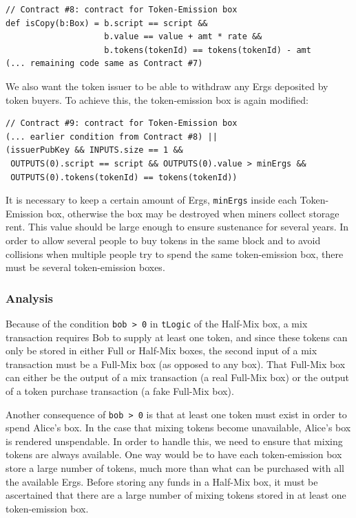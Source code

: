 \documentclass[runningheads]{llncs}
\begin{document}
{\small
\begin{Verbatim}[frame=single]
// Contract #8: contract for Token-Emission box
def isCopy(b:Box) = b.script == script && 
                    b.value == value + amt * rate &&
                    b.tokens(tokenId) == tokens(tokenId) - amt
(... remaining code same as Contract #7)
\end{Verbatim}
}

We also want the token issuer to be able to withdraw any Ergs deposited by token buyers. To achieve this, the token-emission box is again modified:

{\small
\begin{Verbatim}[frame=single]
// Contract #9: contract for Token-Emission box
(... earlier condition from Contract #8) || 
(issuerPubKey && INPUTS.size == 1 && 
 OUTPUTS(0).script == script && OUTPUTS(0).value > minErgs &&
 OUTPUTS(0).tokens(tokenId) == tokens(tokenId))
\end{Verbatim}
}
It is necessary to keep a certain amount of Ergs, \texttt{minErgs} inside each Token-Emission box, otherwise the box may be destroyed when miners collect storage rent. This value should be large enough to ensure sustenance for several years. 
In order to allow several people to buy tokens in the same block and to avoid collisions when multiple people try to spend the same token-emission box, there must be several token-emission boxes. 

\subsubsection{Analysis}

Because of the condition \texttt{bob > 0} in \texttt{tLogic} of the Half-Mix box, a mix transaction requires Bob to supply at least one token, and since these tokens can only be stored in either Full or Half-Mix boxes, the second input of a mix transaction must be a Full-Mix box (as opposed to any box).
That Full-Mix box can either be the output of a mix transaction (a real Full-Mix box) or the output of a token purchase transaction (a fake Full-Mix box).

Another consequence of \texttt{bob > 0} is that at least one token must exist in order to spend Alice's box. In the case that mixing tokens become unavailable, Alice's box is rendered unspendable. In order to handle this, we need to ensure that mixing tokens are always available. One way would be to have each token-emission box store a large number of tokens, much more than what can be purchased with all the available Ergs. Before storing any funds in a Half-Mix box, it must be ascertained that there are a large number of mixing tokens stored in at least one token-emission box. 
\end{document}
